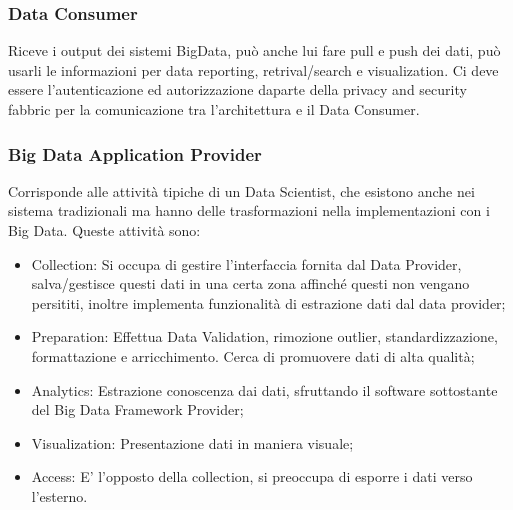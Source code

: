 \documentclass[11pt, twocolumn]{article}
\newenvironment{myitemize}
{ \begin{itemize}[topsep=0ex]
		\setlength{\itemsep}{0pt}
		\setlength{\parskip}{0pt}
		\setlength{\parsep}{0pt}     }
	{ \end{itemize}                  }
\begin{document}
\subsubsection{Data Consumer}
Riceve i output dei sistemi BigData, può anche lui fare pull e push dei dati, può usarli le informazioni per data reporting, retrival/search e visualization. Ci deve essere l'autenticazione ed autorizzazione daparte della privacy and security fabbric per la comunicazione tra l'architettura e il Data Consumer.

\subsubsection{Big Data Application Provider}
Corrisponde alle attività tipiche di un Data Scientist, che esistono anche nei sistema tradizionali ma hanno delle trasformazioni nella implementazioni con i Big Data. Queste attività sono:
\begin{myitemize}
	\item Collection: Si occupa di gestire l'interfaccia fornita dal Data Provider, salva/gestisce questi dati in una certa zona affinché questi non vengano persititi, inoltre implementa funzionalità di estrazione dati dal data provider;
	\item Preparation: Effettua Data Validation, rimozione outlier, standardizzazione, formattazione e arricchimento. 
	Cerca di promuovere dati di alta qualità;
	\item Analytics: Estrazione conoscenza dai dati, sfruttando il software sottostante del Big Data Framework Provider;
	\item Visualization: Presentazione dati in maniera visuale;
	\item Access: E' l'opposto della collection, si preoccupa di esporre i dati verso l'esterno. 
\end{myitemize}
\end{document}
